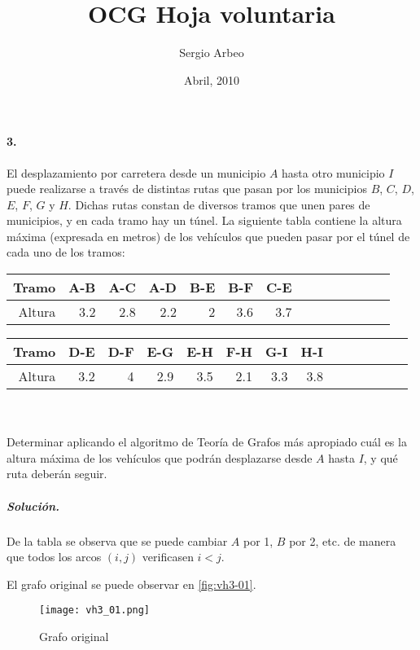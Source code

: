 \documentclass[12pt, oneside, a4paper]{article}
\begin{document}
\title{OCG Hoja voluntaria}\author{Sergio Arbeo}\date{Abril, 2010}\maketitle
\paragraph{3.}\label{ssub:1_} %
El desplazamiento por carretera desde un municipio $A$ hasta otro
municipio $I$ puede realizarse a través de distintas rutas que pasan
por los municipios $B$, $C$, $D$, $E$, $F$, $G$ y $H$. Dichas rutas
constan de diversos tramos que unen pares de municipios, y en cada
tramo hay un túnel. La siguiente tabla contiene la altura máxima
(expresada en metros) de los vehículos que pueden pasar por el túnel
de cada uno de los tramos:

\begin{tabular}{| r | r | r | r | r | r | r | r | r | r | r | r | r | r |}
\hline
Tramo  & A-B & A-C & A-D & B-E & B-F & C-E \\
\hline
Altura & 3.2   &  2.8  &  2.2  &   2   &  3.6  &  3.7  \\
\hline
\end{tabular}

\begin{tabular}{| r | r | r | r | r | r | r | r | r | r | r | r | r | r |}
\hline
Tramo  & D-E & D-F &  E-G  &  E-H  &  F-H  &  G-I  & H-I \\
\hline
Altura & 3.2 &  4  &  2.9  &  3.5  &  2.1  &  3.3  &  3.8  \\
\hline
\end{tabular}
\\
\\

Determinar aplicando el algoritmo de Teoría de Grafos más apropiado
cuál es la altura máxima de los vehículos que podrán desplazarse desde
$A$ hasta $I$, y qué ruta deberán seguir.

\subparagraph{Solución.\\}
De la tabla se observa que se puede cambiar $A$ por 1, $B$ por 2,
etc. de manera que todos los arcos $(i,j)$ verificasen $i<j$.

El grafo original se puede observar en \autoref{fig:vh3-01}.

\begin{figure}
\centering
\texttt{[image: vh3\_01.png]}
\caption{Grafo original}
\label{fig:vh3-01}
\end{figure}
\end{document}
